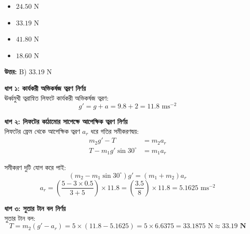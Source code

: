 \documentclass[12pt, a4paper]{article}
\begin{document}
\begin{itemize}[label={}, leftmargin=1cm, itemsep=0.5em]
\item[\textbf{A)}] $24.50\text{ N}$
\item[\textbf{B)}] $33.19\text{ N}$
\item[\textbf{C)}] $41.80\text{ N}$
\item[\textbf{D)}] $18.60\text{ N}$
\end{itemize}
\vspace{0.5em}

\begin{tcolorbox}[answerbox]
\textbf{\color{success} উত্তর:} B) $33.19\text{ N}$
\end{tcolorbox}
\vspace{1em}

\begin{tcolorbox}[solutionbox={সমাধান (Solution)}]
\noindent
\textbf{ধাপ ১: কার্যকরী অভিকর্ষজ ত্বরণ নির্ণয়} \\
ঊর্ধ্বমুখী ত্বরান্বিত লিফটে কার্যকরী অভিকর্ষজ ত্বরণ:
\[g' = g + a = 9.8 + 2 = 11.8\text{ ms}^{-2}\]

\vspace{0.5em}
\noindent\textbf{ধাপ ২: লিফটের কাঠামোর সাপেক্ষে আপেক্ষিক ত্বরণ নির্ণয়} \\
লিফটের ফ্রেম থেকে আপেক্ষিক ত্বরণ $a_r$ ধরে গতির সমীকরণদ্বয়:
\begin{align*}
    m_2 g' - T &= m_2 a_r \\
    T - m_1 g' \sin 30^\circ &= m_1 a_r
\end{align*}

সমীকরণ দুটি যোগ করে পাই:
\[(m_2 - m_1 \sin 30^\circ)g' = (m_1 + m_2)a_r\]
\[a_r = \left(\frac{5 - 3 \times 0.5}{3 + 5}\right) \times 11.8 = \left(\frac{3.5}{8}\right) \times 11.8 = 5.1625\text{ ms}^{-2}\]

\vspace{0.5em}
\noindent\textbf{ধাপ ৩: সুতার টান বল নির্ণয়} \\
সুতার টান বল:
\[T = m_2 (g' - a_r) = 5 \times (11.8 - 5.1625) = 5 \times 6.6375 = 33.1875\text{ N} \approx \mathbf{33.19\text{ N}}\]
\end{tcolorbox}

\vspace{2em}
\end{document}
